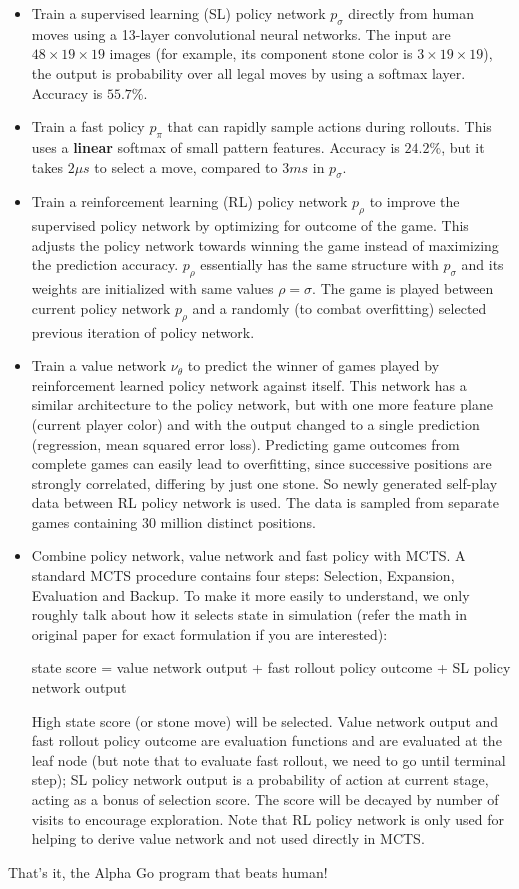 \documentclass[11pt]{article}
\begin{document}
\begin{itemize}
\item Train a supervised learning (SL) policy network $p_{\sigma}$ directly from human moves using a 13-layer convolutional neural networks. The input are $48\times 19 \times 19$ images (for example, its component stone color is $3\times 19 \times 19$), the output is probability over all legal moves by using a softmax layer. Accuracy is $55.7\%$.
\item Train a fast policy $p_{\pi}$ that can rapidly sample actions during rollouts. This uses a \textbf{linear} softmax of small pattern features. Accuracy is $24.2\%$, but it takes $2\mu s$ to select a move, compared to $3ms$ in $p_{\sigma}$.
\item Train a reinforcement learning (RL) policy network $p_{\rho}$ to improve the supervised policy network by optimizing for outcome of the game. This adjusts the policy network towards winning the game instead of maximizing the prediction accuracy. $p_{\rho}$ essentially has the same structure with $p_{\sigma}$ and its weights are initialized with same values $\rho = \sigma$. The game is played between current policy network $p_{\rho}$ and a randomly (to combat overfitting) selected previous iteration of policy network.
\item Train a value network $\nu_{\theta}$ to predict the winner of games played by reinforcement learned policy network against itself. This network has a similar architecture to the policy network, but with one more feature plane (current player color) and with the output changed to a single prediction (regression, mean squared error loss). Predicting game outcomes from complete games can easily lead to overfitting, since successive positions are strongly correlated, differing by just one stone. So newly generated self-play data between RL policy network is used. The data is sampled from separate games containing 30 million distinct positions.
\item Combine policy network, value network and fast policy with MCTS. A standard MCTS procedure contains four steps: Selection, Expansion, Evaluation and Backup. To make it more easily to understand, we only roughly talk about how it selects state in simulation (refer the math in original paper for exact formulation if you are interested): 

state score = value network output + fast rollout policy outcome + SL policy network output

High state score (or stone move) will be selected. Value network output and fast rollout policy outcome are evaluation functions and are evaluated at the leaf node (but note that to evaluate fast rollout, we need to go until terminal step); SL policy network output is a probability of action at current stage, acting as a bonus of selection score. The score will be decayed by number of visits to encourage exploration. Note that RL policy network is only used for helping to derive value network and not used directly in MCTS.  
\end{itemize}

That's it, the Alpha Go program that beats human!


\end{document}
